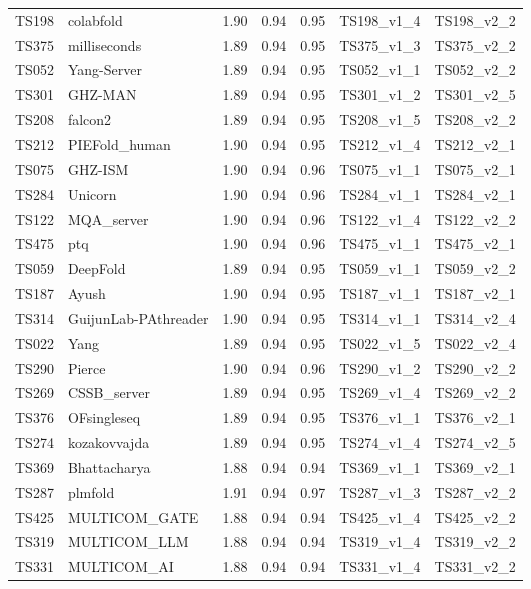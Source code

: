 \begin{longtable}{lllllll}
TS198 & colabfold & 1.90 & 0.94 & 0.95 & TS198\_v1\_4 & TS198\_v2\_2 \\ 
TS375 & milliseconds & 1.89 & 0.94 & 0.95 & TS375\_v1\_3 & TS375\_v2\_2 \\ 
TS052 & Yang-Server & 1.89 & 0.94 & 0.95 & TS052\_v1\_1 & TS052\_v2\_2 \\ 
TS301 & GHZ-MAN & 1.89 & 0.94 & 0.95 & TS301\_v1\_2 & TS301\_v2\_5 \\ 
TS208 & falcon2 & 1.89 & 0.94 & 0.95 & TS208\_v1\_5 & TS208\_v2\_2 \\ 
TS212 & PIEFold\_human & 1.90 & 0.94 & 0.95 & TS212\_v1\_4 & TS212\_v2\_1 \\ 
TS075 & GHZ-ISM & 1.90 & 0.94 & 0.96 & TS075\_v1\_1 & TS075\_v2\_1 \\ 
TS284 & Unicorn & 1.90 & 0.94 & 0.96 & TS284\_v1\_1 & TS284\_v2\_1 \\ 
TS122 & MQA\_server & 1.90 & 0.94 & 0.96 & TS122\_v1\_4 & TS122\_v2\_2 \\ 
TS475 & ptq & 1.90 & 0.94 & 0.96 & TS475\_v1\_1 & TS475\_v2\_1 \\ 
TS059 & DeepFold & 1.89 & 0.94 & 0.95 & TS059\_v1\_1 & TS059\_v2\_2 \\ 
TS187 & Ayush & 1.90 & 0.94 & 0.95 & TS187\_v1\_1 & TS187\_v2\_1 \\ 
TS314 & GuijunLab-PAthreader & 1.90 & 0.94 & 0.95 & TS314\_v1\_1 & TS314\_v2\_4 \\ 
TS022 & Yang & 1.89 & 0.94 & 0.95 & TS022\_v1\_5 & TS022\_v2\_4 \\ 
TS290 & Pierce & 1.90 & 0.94 & 0.96 & TS290\_v1\_2 & TS290\_v2\_2 \\ 
TS269 & CSSB\_server & 1.89 & 0.94 & 0.95 & TS269\_v1\_4 & TS269\_v2\_2 \\ 
TS376 & OFsingleseq & 1.89 & 0.94 & 0.95 & TS376\_v1\_1 & TS376\_v2\_1 \\ 
TS274 & kozakovvajda & 1.89 & 0.94 & 0.95 & TS274\_v1\_4 & TS274\_v2\_5 \\ 
TS369 & Bhattacharya & 1.88 & 0.94 & 0.94 & TS369\_v1\_1 & TS369\_v2\_1 \\ 
TS287 & plmfold & 1.91 & 0.94 & 0.97 & TS287\_v1\_3 & TS287\_v2\_2 \\ 
TS425 & MULTICOM\_GATE & 1.88 & 0.94 & 0.94 & TS425\_v1\_4 & TS425\_v2\_2 \\ 
TS319 & MULTICOM\_LLM & 1.88 & 0.94 & 0.94 & TS319\_v1\_4 & TS319\_v2\_2 \\ 
TS331 & MULTICOM\_AI & 1.88 & 0.94 & 0.94 & TS331\_v1\_4 & TS331\_v2\_2 \\ 

\end{longtable}
